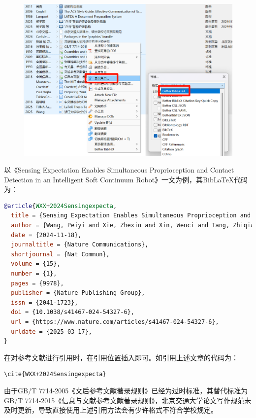 \begin{figure}[htbp]
  \centering
  \includegraphics[width=0.8\linewidth]{figures/Zotero导出BibLaTeX流程.png}
  \label{fig:zotero}
\end{figure}

以《Sensing Expectation Enables Simultaneous Proprioception and Contact Detection in an Intelligent Soft Continuum Robot\cite{WXX+2024Sensingexpecta}》一文为例，其BibLaTeX代码为：

\begin{lstlisting}[language={BibTeX},keywordstyle={\color{Periwinkle}\bfseries}]
@article{WXX+2024Sensingexpecta,
  title = {Sensing Expectation Enables Simultaneous Proprioception and Contact Detection in an Intelligent Soft Continuum Robot},
  author = {Wang, Peiyi and Xie, Zhexin and Xin, Wenci and Tang, Zhiqiang and Yang, Xinhua and Mohanakrishnan, Muralidharan and Guo, Sheng and Laschi, Cecilia},
  date = {2024-11-18},
  journaltitle = {Nature Communications},
  shortjournal = {Nat Commun},
  volume = {15},
  number = {1},
  pages = {9978},
  publisher = {Nature Publishing Group},
  issn = {2041-1723},
  doi = {10.1038/s41467-024-54327-6},
  url = {https://www.nature.com/articles/s41467-024-54327-6},
  urldate = {2025-03-17},
}
\end{lstlisting}

在对参考文献进行引用时，在引用位置插入即可。如引用上述文章的代码为：

\begin{lstlisting}[language={[LaTeX]TeX}]
    \cite{WXX+2024Sensingexpecta}
\end{lstlisting}

由于GB/T 7714-2005《文后参考文献著录规则\cite{QuanGuoXin2005WenHouCanKaoWenXianZhuLuGuiZe}》已经为过时标准，其替代标准为GB/T 7714-2015《信息与文献\quad 参考文献著录规则\cite{QuanGuoXin2015XinXiYuWenXianCanKaoWenXianZhuLuGuiZe}》，北京交通大学论文写作规范未及时更新，导致直接使用上述引用方法会有少许格式不符合学校规定。

